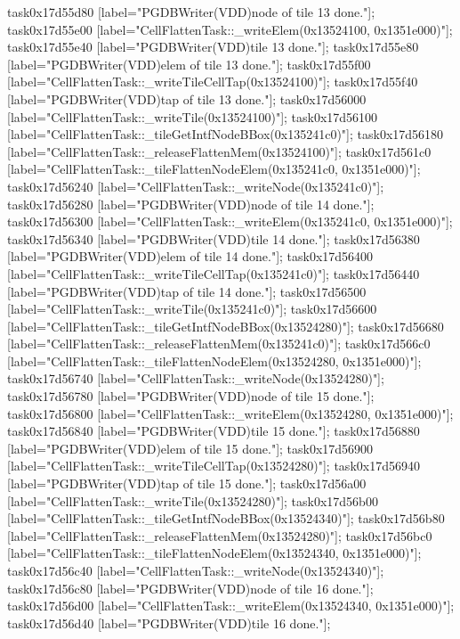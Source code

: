 {	task0x17d55d80 [label="PGDBWriter(VDD)\nCell node of tile 13 done."];
	task0x17d55e00 [label="CellFlattenTask::_writeElem(0x13524100, 0x1351e000)"];
	task0x17d55e40 [label="PGDBWriter(VDD)\nCell tile 13 done."];
	task0x17d55e80 [label="PGDBWriter(VDD)\nCell elem of tile 13 done."];
	task0x17d55f00 [label="CellFlattenTask::_writeTileCellTap(0x13524100)"];
	task0x17d55f40 [label="PGDBWriter(VDD)\nCell tap of tile 13 done."];
	task0x17d56000 [label="CellFlattenTask::_writeTile(0x13524100)"];
	task0x17d56100 [label="CellFlattenTask::_tileGetIntfNodeBBox(0x135241c0)"];
	task0x17d56180 [label="CellFlattenTask::_releaseFlattenMem(0x13524100)"];
	task0x17d561c0 [label="CellFlattenTask::_tileFlattenNodeElem(0x135241c0, 0x1351e000)"];
	task0x17d56240 [label="CellFlattenTask::_writeNode(0x135241c0)"];
	task0x17d56280 [label="PGDBWriter(VDD)\nCell node of tile 14 done."];
	task0x17d56300 [label="CellFlattenTask::_writeElem(0x135241c0, 0x1351e000)"];
	task0x17d56340 [label="PGDBWriter(VDD)\nCell tile 14 done."];
	task0x17d56380 [label="PGDBWriter(VDD)\nCell elem of tile 14 done."];
	task0x17d56400 [label="CellFlattenTask::_writeTileCellTap(0x135241c0)"];
	task0x17d56440 [label="PGDBWriter(VDD)\nCell tap of tile 14 done."];
	task0x17d56500 [label="CellFlattenTask::_writeTile(0x135241c0)"];
	task0x17d56600 [label="CellFlattenTask::_tileGetIntfNodeBBox(0x13524280)"];
	task0x17d56680 [label="CellFlattenTask::_releaseFlattenMem(0x135241c0)"];
	task0x17d566c0 [label="CellFlattenTask::_tileFlattenNodeElem(0x13524280, 0x1351e000)"];
	task0x17d56740 [label="CellFlattenTask::_writeNode(0x13524280)"];
	task0x17d56780 [label="PGDBWriter(VDD)\nCell node of tile 15 done."];
	task0x17d56800 [label="CellFlattenTask::_writeElem(0x13524280, 0x1351e000)"];
	task0x17d56840 [label="PGDBWriter(VDD)\nCell tile 15 done."];
	task0x17d56880 [label="PGDBWriter(VDD)\nCell elem of tile 15 done."];
	task0x17d56900 [label="CellFlattenTask::_writeTileCellTap(0x13524280)"];
	task0x17d56940 [label="PGDBWriter(VDD)\nCell tap of tile 15 done."];
	task0x17d56a00 [label="CellFlattenTask::_writeTile(0x13524280)"];
	task0x17d56b00 [label="CellFlattenTask::_tileGetIntfNodeBBox(0x13524340)"];
	task0x17d56b80 [label="CellFlattenTask::_releaseFlattenMem(0x13524280)"];
	task0x17d56bc0 [label="CellFlattenTask::_tileFlattenNodeElem(0x13524340, 0x1351e000)"];
	task0x17d56c40 [label="CellFlattenTask::_writeNode(0x13524340)"];
	task0x17d56c80 [label="PGDBWriter(VDD)\nCell node of tile 16 done."];
	task0x17d56d00 [label="CellFlattenTask::_writeElem(0x13524340, 0x1351e000)"];
	task0x17d56d40 [label="PGDBWriter(VDD)\nCell tile 16 done."];
}
